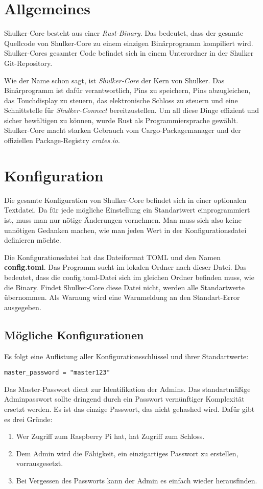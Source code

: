 \section{Allgemeines}
Shulker-Core besteht aus einer \textit{Rust-Binary}. Das bedeutet, dass der gesamte Quellcode von Shulker-Core zu einem einzigen
Binärprogramm kompiliert wird. Shulker-Cores gesamter Code befindet sich in einem Unterordner in der Shulker Git-Repository.

Wie der Name schon sagt, ist \textit{Shulker-Core} der Kern von Shulker. Das Binärprogramm ist dafür verantwortlich,
Pins zu speichern, Pins abzugleichen, das Touchdisplay zu steuern, das elektronische Schloss zu steuern und eine Schnittstelle
für \textit{Shulker-Connect} bereitzustellen. Um all diese Dinge effizient und sicher bewältigen zu können, wurde Rust als
Programmiersprache gewählt. Shulker-Core macht starken Gebrauch vom Cargo-Packagemanager und der offiziellen Package-Registry \textit{crates.io}.

\section{Konfiguration}
Die gesamte Konfiguration von Shulker-Core befindet sich in einer optionalen Textdatei. Da für jede mögliche Einstellung ein
Standartwert einprogrammiert ist, muss man nur nötige Änderungen vornehmen. Man muss sich also keine unnötigen Gedanken machen,
wie man jeden Wert in der Konfigurationsdatei definieren möchte.

Die Konfigurationsdatei hat das Dateiformat TOML und den Namen \textbf{config.toml}. Das Programm sucht im lokalen Ordner
nach dieser Datei. Das bedeutet, dass die config.toml-Datei sich im gleichen Ordner befinden muss, wie die Binary. Findet
Shulker-Core diese Datei nicht, werden alle Standartwerte übernommen. Als Warnung wird eine 
Warnmeldung an den Standart-Error ausgegeben.

\subsection{Mögliche Konfigurationen}
Es folgt eine Auflistung aller Konfigurationsschlüssel und ihrer Standartwerte:

\lstinline{master_password = "master123"}

Das Master-Passwort dient zur Identifikation der Admins. Das standartmäßige Adminpasswort sollte dringend durch 
ein Passwort vernünftiger Komplexität ersetzt werden. Es ist das einzige Passwort, das nicht gehashed wird. Dafür
gibt es drei Gründe: 
\begin{enumerate}
    \item Wer Zugriff zum Raspberry Pi hat, hat Zugriff zum Schloss.
    \item Dem Admin wird die Fähigkeit, ein einzigartiges Passwort zu erstellen, vorrausgesetzt.
    \item Bei Vergessen des Passworts kann der Admin es einfach wieder herausfinden. 
\end{enumerate}


